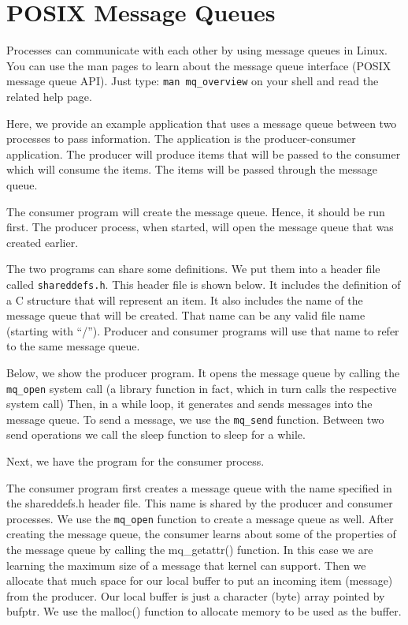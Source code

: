 \section{POSIX Message Queues}

Processes can communicate with each other by using message queues in
Linux. You can use the man pages to learn about the message queue
interface (POSIX message queue API). Just type: {\tt man mq\_overview}
on your shell and read the related help page.

Here, we provide an example application that uses a message queue
between two processes to pass information. The application is the
producer-consumer application. The producer will produce items that
will be passed to the consumer which will consume the items. The items
will be passed through the message queue.

The consumer program will create the message queue. Hence, it should
be run first. The producer process, when started, will open the
message queue that was created earlier. 

The two programs can share some definitions. We put them into a header
file called {\tt shareddefs.h}. This header file is shown below. It
includes the definition of a C structure that will represent an item.
It also includes the name of the message queue that will be
created. That name can be any valid file name (starting with
``/''). Producer and consumer programs will use that name to refer to
the same message queue.


Below, we show the producer program. It opens the message queue by
calling the {\tt mq\_open} system call (a library function in fact,
which in turn calls the respective system call) Then, in a while loop,
it generates and sends messages into the message queue. To send a
message, we use the {\tt mq\_send} function.  Between two send
operations we call the sleep function to sleep for a while.


Next, we have the program for the consumer process.


The consumer program first creates a message queue with the name
specified in the shareddefs.h header file. This name is shared by the
producer and consumer processes. We use the {\tt mq\_open} function to
create a message queue as well.  After creating the message queue, the
consumer learns about some of the properties of the message queue by
calling the mq\_getattr() function. In this case we are learning the
maximum size of a message that kernel can support. Then we allocate
that much space for our local buffer to put an incoming item (message)
from the producer.  Our local buffer is just a character (byte) array
pointed by bufptr. We use the malloc() function to allocate memory to
be used as the buffer.

